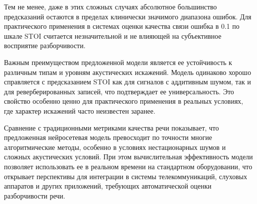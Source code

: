 \documentclass[oneside, final, 14pt]{extarticle}
\begin{document}
Тем не менее, даже в этих сложных случаях абсолютное большинство предсказаний остаются в пределах клинически значимого диапазона ошибок. Для практического применения в системах оценки качества связи ошибка в 0.1 по шкале STOI считается незначительной и не влияющей на субъективное восприятие разборчивости.

Важным преимуществом предложенной модели является ее устойчивость к различным типам и уровням акустических искажений. Модель одинаково хорошо справляется с предсказанием STOI как для сигналов с аддитивным шумом, так и для реверберированных записей, что подтверждает ее универсальность. Это свойство особенно ценно для практического применения в реальных условиях, где характер искажений часто неизвестен заранее.

Сравнение с традиционными метриками качества речи показывает, что предложенная нейросетевая модель превосходит по точности многие алгоритмические методы, особенно в условиях нестационарных шумов и сложных акустических условий. При этом вычислительная эффективность модели позволяет использовать ее в реальном времени на стандартном оборудовании, что открывает перспективы для интеграции в системы телекоммуникаций, слуховых аппаратов и других приложений, требующих автоматической оценки разборчивости речи.


\newpage
\printbibliography
\end{document}
